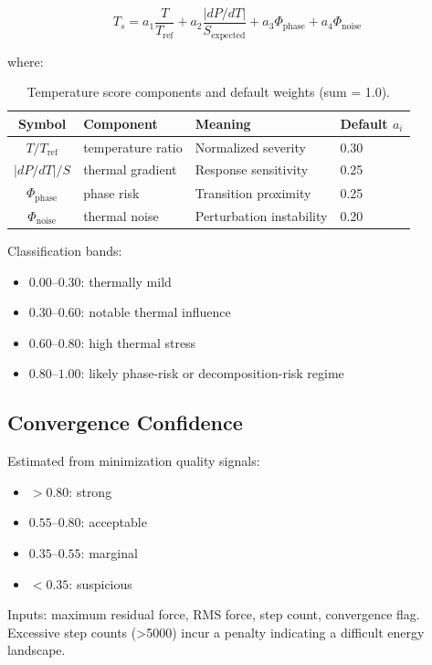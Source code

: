 \documentclass[11pt,a4paper]{article}
\begin{document}
\begin{equation}
  T_s = a_1 \frac{T}{T_{\text{ref}}}
      + a_2 \frac{|dP/dT|}{S_{\text{expected}}}
      + a_3 \Phi_{\text{phase}}
      + a_4 \Phi_{\text{noise}}
\end{equation}

\noindent where:
\begin{table}[h]
\centering
\begin{tabular}{clll}
\toprule
\textbf{Symbol} & \textbf{Component} & \textbf{Meaning} & \textbf{Default $a_i$} \\
\midrule
$T/T_{\text{ref}}$ & temperature ratio & Normalized severity & 0.30 \\
$|dP/dT|/S$        & thermal gradient  & Response sensitivity & 0.25 \\
$\Phi_{\text{phase}}$ & phase risk     & Transition proximity & 0.25 \\
$\Phi_{\text{noise}}$ & thermal noise  & Perturbation instability & 0.20 \\
\bottomrule
\end{tabular}
\caption{Temperature score components and default weights (sum = 1.0).}
\end{table}

\noindent Classification bands:
\begin{itemize}[nosep]
  \item $0.00$--$0.30$: thermally mild
  \item $0.30$--$0.60$: notable thermal influence
  \item $0.60$--$0.80$: high thermal stress
  \item $0.80$--$1.00$: likely phase-risk or decomposition-risk regime
\end{itemize}

\subsection{Convergence Confidence}

Estimated from minimization quality signals:
\begin{itemize}[nosep]
  \item $> 0.80$: strong
  \item $0.55$--$0.80$: acceptable
  \item $0.35$--$0.55$: marginal
  \item $< 0.35$: suspicious
\end{itemize}

Inputs: maximum residual force, RMS force, step count, convergence flag.
Excessive step counts (>5000) incur a penalty indicating a difficult
energy landscape.
\end{document}
